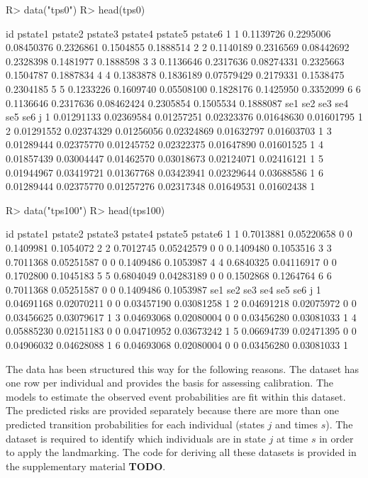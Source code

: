 \documentclass[nojss]{jss}
\begin{document}
\begin{Schunk}
\begin{Sinput}
R> data("tps0")
R> head(tps0)
\end{Sinput}
\begin{Soutput}
  id   pstate1   pstate2    pstate3   pstate4   pstate5   pstate6
1  1 0.1139726 0.2295006 0.08450376 0.2326861 0.1504855 0.1888514
2  2 0.1140189 0.2316569 0.08442692 0.2328398 0.1481977 0.1888598
3  3 0.1136646 0.2317636 0.08274331 0.2325663 0.1504787 0.1887834
4  4 0.1383878 0.1836189 0.07579429 0.2179331 0.1538475 0.2304185
5  5 0.1233226 0.1609740 0.05508100 0.1828176 0.1425950 0.3352099
6  6 0.1136646 0.2317636 0.08462424 0.2305854 0.1505534 0.1888087
         se1        se2        se3        se4        se5        se6 j
1 0.01291133 0.02369584 0.01257251 0.02323376 0.01648630 0.01601795 1
2 0.01291552 0.02374329 0.01256056 0.02324869 0.01632797 0.01603703 1
3 0.01289444 0.02375770 0.01245752 0.02322375 0.01647890 0.01601525 1
4 0.01857439 0.03004447 0.01462570 0.03018673 0.02124071 0.02416121 1
5 0.01944967 0.03419721 0.01367768 0.03423941 0.02329644 0.03688586 1
6 0.01289444 0.02375770 0.01257276 0.02317348 0.01649531 0.01602438 1
\end{Soutput}
\begin{Sinput}
R> data("tps100")
R> head(tps100)
\end{Sinput}
\begin{Soutput}
  id   pstate1    pstate2 pstate3 pstate4   pstate5   pstate6
1  1 0.7013881 0.05220658       0       0 0.1409981 0.1054072
2  2 0.7012745 0.05242579       0       0 0.1409480 0.1053516
3  3 0.7011368 0.05251587       0       0 0.1409486 0.1053987
4  4 0.6840325 0.04116917       0       0 0.1702800 0.1045183
5  5 0.6804049 0.04283189       0       0 0.1502868 0.1264764
6  6 0.7011368 0.05251587       0       0 0.1409486 0.1053987
         se1        se2 se3 se4        se5        se6 j
1 0.04691168 0.02070211   0   0 0.03457190 0.03081258 1
2 0.04691218 0.02075972   0   0 0.03456625 0.03079617 1
3 0.04693068 0.02080004   0   0 0.03456280 0.03081033 1
4 0.05885230 0.02151183   0   0 0.04710952 0.03673242 1
5 0.06694739 0.02471395   0   0 0.04906032 0.04628088 1
6 0.04693068 0.02080004   0   0 0.03456280 0.03081033 1
\end{Soutput}
\end{Schunk}

The data has been structured this way for the following reasons. The  dataset has one row per individual and provides the basis for assessing calibration. The models to estimate the observed event probabilities are fit within this dataset. The predicted risks are provided separately because there are more than one predicted transition probabilities for each individual (states $j$ and times $s$). The  dataset is required to identify which individuals are in state $j$ at time $s$ in order to apply the landmarking. The code for deriving all these datasets is provided in the supplementary material \textbf{TODO}.
\end{document}

